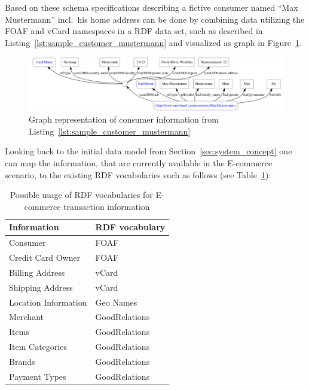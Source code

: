 Based on these schema specifications describing a fictive consumer named ``Max Mustermann'' incl.\ his home address can be done by combining data utilizing the \gls{FOAF} and \gls{vCard} namespaces in a \gls{RDF} data set, such as described in Listing~\ref{lst:sample_customer_mustermann} and visualized as graph in Figure~\ref{fig:images_sample_customer}. \@


\begin{figure}[H]
	\centering
		\includegraphics[width=\columnwidth]{images/sample_customer_mustermann.pdf}
	\caption{Graph representation of consumer information from Listing~\ref{lst:sample_customer_mustermann}}
\label{fig:images_sample_customer}
\end{figure}

Looking back to the initial data model from Section~\ref{sec:system_concept} one can map the information, that are currently available in the \gls{E-commerce} scenario, to the existing \gls{RDF} vocabularies such as follows (see Table~\ref{tab:map_tx_rdf_vocab}):\@

\begin{table}[H]
\centering
\begin{tabular}{p{5cm}l}
\hline
\textbf{Information} & \textbf{RDF vocabulary} \\
\hline
Consumer & FOAF \\
\hline
Credit Card Owner & FOAF \\
\hline
Billing Address & vCard \\
\hline
Shipping Address & vCard \\
\hline
Location Information & Geo Names \\
\hline
Merchant & GoodRelations \\
\hline
Items & GoodRelations \\
\hline
Item Categories & GoodRelations \\
\hline
Brands & GoodRelations \\
\hline
Payment Types & GoodRelations \\
\hline
\end{tabular}
\caption{Possible usage of \gls{RDF} vocabularies for \gls{E-commerce} transaction information}
\label{tab:map_tx_rdf_vocab}
\end{table}

